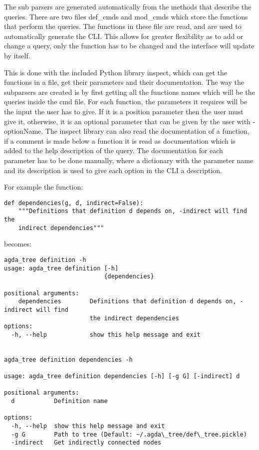 The sub parsers are generated automatically from the methods that describe the
queries. There are two files def\_cmds and mod\_cmds which store the functions
that perform the queries. The functions in these file are read, and are used to
automatically generate the CLI. This allows for greater flexibility as to add
or change a query, only the function has to be changed and the interface will
update by itself.

This is done with the included Python library inspect, which can get the
functions in a file, get their parameters and their documentation. The way the
subparsers are created is by first getting all the functions names which will
be the queries inside the cmd file. For each function, the parameters it
requires will be the input the user has to give. If it is a position parameter
then the user must give it, otherwise, it is an optional parameter that can be
given by the user with -optionName. The inspect library can also read the
documentation of a function, if a comment is made below a function it is read
as documentation which is added to the help description of the query. The
documentation for each parameter has to be done manually, where a dictionary
with the parameter name and its description is used to give each option in the
CLI a description.

For example the function:

\begin{lstlisting}
def dependencies(g, d, indirect=False):
    """Definitions that definition d depends on, -indirect will find the
    indirect dependencies"""
\end{lstlisting}

becomes:

\begin{lstlisting}
agda_tree definition -h
usage: agda_tree definition [-h]
                            {dependencies}

positional arguments:
    dependencies        Definitions that definition d depends on, -indirect will find
                        the indirect dependencies
options:
  -h, --help            show this help message and exit


agda_tree definition dependencies -h

usage: agda_tree definition dependencies [-h] [-g G] [-indirect] d

positional arguments:
  d           Definition name

options:
  -h, --help  show this help message and exit
  -g G        Path to tree (Default: ~/.agda\_tree/def\_tree.pickle)
  -indirect   Get indirectly connected nodes
\end{lstlisting}

